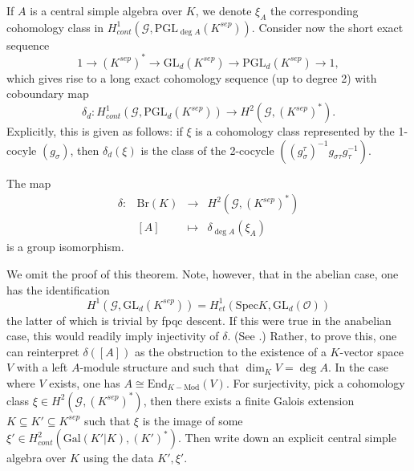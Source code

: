 \noindent
If $A$ is a central simple algebra over $K$, we denote $\xi_A$ the 
corresponding cohomology class in $H_{cont}^1 (\mathcal{G}, \text{PGL}_{\deg 
A}(K^{sep}))$. Consider now the short exact sequence 
$$
1 \to (K^{sep})^* \to \text{GL}_d(K^{sep}) \to \text{PGL}_d(K^{sep}) \to 1,
$$
 which gives rise to a long exact cohomology sequence (up to degree 2) with 
coboundary map 
 $$
 \delta_d : H_{cont} ^1(\mathcal{G}, \text{PGL}_d(K^{sep})) \to H^2 
(\mathcal{G}, (K^{sep})^*).
 $$ 
Explicitly, this is given as follows: if $\xi$ is a cohomology class 
represented by the 1-cocyle $(g_\sigma)$, then $\delta_d(\xi)$ is the class of 
the 2-cocycle $((g_\sigma^\tau)^{-1} g_{\sigma \tau} g_\tau^{-1})$. 

\begin{theorem} \label{thm:BrauerDelta}
The map
$$
\begin{matrix}
\delta : & \text{Br}(K) &  \longrightarrow & H^2(\mathcal{G}, (K^{sep})^*) \\
& [A] & \longmapsto & \delta_{\deg A} (\xi_A)
\end{matrix}
$$
is a group isomorphism.
\end{theorem}

\noindent
We omit the proof of this theorem. Note, however, that in the abelian case, one 
has the identification
$$
H^1 (\mathcal{G}, \text{GL}_d(K^{sep})) = H_{et}^1 (\text{Spec} K, 
\text{GL}_d(\mathcal{O}))
$$
the latter of which is trivial by fpqc descent. If this were true in the 
anabelian case, this would readily imply injectivity of $\delta$. (See 
\cite{SGA4.5}.) Rather, to prove this, one can reinterpret $\delta([A])$ as the 
obstruction to the existence of a $K$-vector space $V$ with a left $A$-module 
structure and such that $\dim_K V = \deg A$. In the case where $V$ exists, one 
has $A \cong \text{End}_{K-\text{Mod}} (V)$. For surjectivity, pick a 
cohomology class $\xi \in H^2(\mathcal{G}, (K^{sep})^*)$, then there exists a 
finite Galois extension $K \subseteq K' \subseteq K^{sep}$ such that $\xi$ is 
the image of some $\xi' \in H_{cont}^2(\text{Gal}(K'|K), (K')^*)$. Then write 
down an explicit central simple algebra over $K$ using the data $K', \xi'$.


